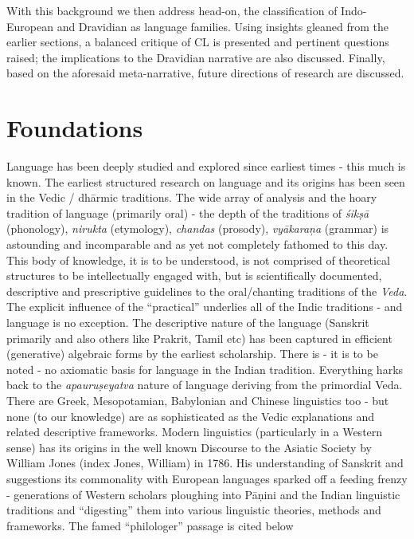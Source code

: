 With this background we then address head-on, the classification of Indo-European and Dravidian as language families. Using insights gleaned from the earlier sections, a balanced critique of CL is presented and pertinent questions raised; the implications to the Dravidian narrative are also discussed. Finally, based on the aforesaid meta-narrative, future directions of research are discussed.


\section*{Foundations}

Language has been deeply studied and explored since earliest times - this much is known. The earliest structured research on language and its origins has been seen in the Vedic / dhārmic traditions. The wide array of analysis and the hoary tradition of language (primarily oral) - the depth of the traditions of \textit{śikṣā} (phonology), \textit{nirukta} (etymology), \textit{chandas} (prosody), \textit{vyākaraņa} (grammar) is astounding and incomparable and as yet not completely fathomed to this day. This body of knowledge, it is to be understood, is not comprised of theoretical structures to be intellectually engaged with, but is scientifically documented, descriptive and prescriptive guidelines to the oral/chanting traditions of the \textit{Veda}. The explicit influence of the “practical” underlies all of the Indic traditions - and language is no exception. The descriptive nature of the language (Sanskrit primarily and also others like Prakrit, Tamil etc) has been captured in efficient (generative) algebraic forms by the earliest scholarship. There is - it is to be noted - no axiomatic basis for language in the Indian tradition. Everything harks back to the \textit{apauruṣeyatva} nature of language deriving from the primordial Veda. There are Greek, Mesopotamian, Babylonian and Chinese linguistics too - but none (to our knowledge) are as sophisticated as the Vedic explanations and related descriptive frameworks. Modern linguistics (particularly in a Western sense) has its origins in the well known Discourse to the Asiatic Society by William Jones (index Jones, William) in 1786. His understanding of Sanskrit and suggestions its commonality with European languages sparked off a feeding frenzy - generations of Western scholars ploughing into Pāņini and the Indian linguistic traditions and “digesting” them into various linguistic theories, methods and frameworks. The famed “philologer” passage is cited below

